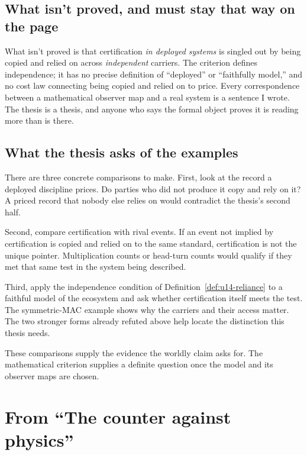 \documentclass[11pt,twoside]{article}
\theoremstyle{thielethm}
\theoremstyle{thieledef}
\theoremstyle{thieledef}
\theoremstyle{thieledef}
\theoremstyle{thielethm}
\theoremstyle{thieleobs}
\theoremstyle{thielethm}
\begin{document}
\subsection{What isn't proved, and must stay that way on the page}

What isn't proved is that certification \emph{in deployed systems} is singled out by being copied and relied on across
\emph{independent} carriers. The criterion defines independence; it has no precise definition of ``deployed'' or ``faithfully model,''
and no cost law connecting being copied and relied on to price. Every correspondence between a mathematical observer
map and a real system is a sentence I wrote. The thesis is a thesis, and anyone who
says the formal object proves it is reading more than is there.

\subsection{What the thesis asks of the examples}

There are three concrete comparisons to make. First, look at the record a deployed
discipline prices. Do parties who did not produce it copy and rely on it? A priced record
that nobody else relies on would contradict the thesis's second half.

Second, compare certification with rival events. If an event not implied by certification
is copied and relied on to the same standard, certification is not the unique pointer.
Multiplication counts or head-turn counts would qualify if they met that same test in the
system being described.

Third, apply the independence condition of Definition~\ref{def:u14-reliance} to a faithful
model of the ecosystem and ask whether certification itself meets the test. The symmetric-MAC
example shows why the carriers and their access matter. The two stronger forms already
refuted above help locate the distinction this thesis needs.

These comparisons supply the evidence the worldly claim asks for. The mathematical
criterion supplies a definite question once the model and its observer maps are chosen.


\section{From ``The counter against physics''}
\end{document}
